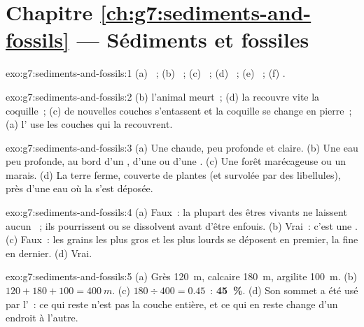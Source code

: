 \section*{Chapitre \ref{ch:g7:sediments-and-fossils} --- Sédiments et fossiles}

\begin{solution}{exo:g7:sediments-and-fossils:1}
(a) ~; (b) ~; (c) ~; (d) ~; (e) ~;
(f) .
\end{solution}

\begin{solution}{exo:g7:sediments-and-fossils:2}
(b) l'animal meurt~; (d) la  recouvre vite la coquille~; (c) de
nouvelles couches s'entassent et la coquille se change en pierre~; (a)
l' use les couches qui la recouvrent.
\end{solution}

\begin{solution}{exo:g7:sediments-and-fossils:3}
(a) Une  chaude, peu profonde et claire. (b) Une eau peu profonde, au
bord d'un , d'une  ou d'une . (c) Une forêt marécageuse ou un
marais. (d) La terre ferme, couverte de plantes (et survolée par des
libellules), près d'une eau où la  s'est déposée.
\end{solution}

\begin{solution}{exo:g7:sediments-and-fossils:4}
(a) Faux~: la plupart des êtres vivants ne laissent aucun ~; ils
pourrissent ou se dissolvent avant d'être enfouis. (b) Vrai~: c'est une
. (c) Faux~: les grains les plus gros et les plus lourds se
déposent en premier, la  fine en dernier. (d) Vrai.
\end{solution}

\begin{solution}{exo:g7:sediments-and-fossils:5}
(a) Grès \qty{120}{m}, calcaire \qty{180}{m}, argilite \qty{100}{m}.
(b) $120 + 180 + 100 = \qty{400}{m}$. (c) $180 \div 400 = 0.45$~:
\textbf{45~\%}. (d) Son sommet a été usé par l'~: ce qui reste n'est
pas la couche entière, et ce qui en reste change d'un endroit à l'autre.
\end{solution}

